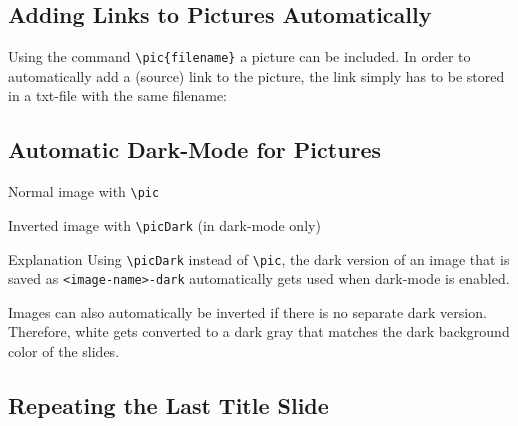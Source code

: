 \documentclass[
	aspectratio=169, %
	8pt, %
]{beamer}
\begin{document}
\subsection{Adding Links to Pictures Automatically}
\begin{frame}{\insertsubsection}
	Using the command \texttt{\textbackslash pic\{filename\}} a picture can be included. In order to automatically add a (source) link to the picture, the link simply has to be stored in a txt-file with the same filename:

\end{frame}

\subsection{Automatic Dark-Mode for Pictures}
\begin{frame}{\insertsubsection}
	\begin{mycolumns}
		\begin{notetight}{Normal image with \texttt{\textbackslash pic}}
			\centering
		\end{notetight}
	\mynextcolumn
		\begin{notetight}{Inverted image with \texttt{\textbackslash picDark} (in dark-mode only)}
			\centering
		\end{notetight}
	\end{mycolumns}
	\begin{note}{Explanation}
		Using \texttt{\textbackslash picDark} instead of \texttt{\textbackslash pic}, the dark version of an image that is saved as \texttt{<image-name>-dark} automatically gets used when dark-mode is enabled.
		
		Images can also automatically be inverted if there is no separate dark version. Therefore, white gets converted to a dark gray that matches the dark background color of the slides.
	\end{note}
\end{frame}

\subsection{Repeating the Last Title Slide}
\againtitle
\end{document}
